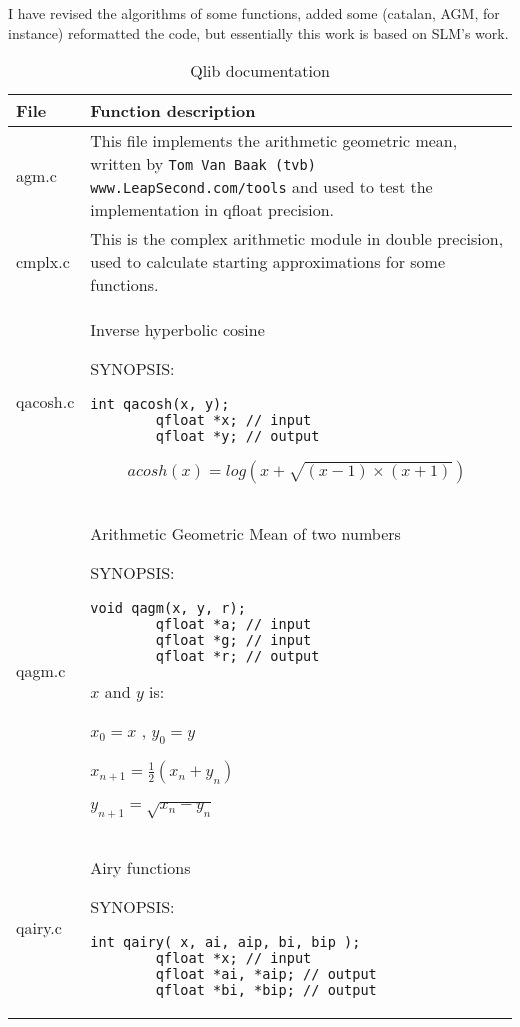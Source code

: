 \documentclass[10pt,a4paper,x11names]{memoir} %
\newcommand{\TOC}[1] {\addcontentsline{toc}{section}{#1} #1 \par}
\begin{document}
I have revised the algorithms of some functions, added some (catalan, AGM, for instance) reformatted the code, but essentially this work is based on SLM's work.

\begin{longtable}{|p{1.5cm}|p{11.5cm}|}
	\caption{Qlib documentation}\\\hline
	\textbf{File}&\textbf{Function description}\\\hline\hline
	\endhead
	
	agm.c&This file implements the arithmetic geometric mean, written by 
	\verb,Tom Van Baak (tvb) www.LeapSecond.com/tools, and used to test the implementation in qfloat precision.\\\hline
	cmplx.c& This is the complex arithmetic module in double precision, used to calculate starting approximations for some functions.\\\hline
	qacosh.c& \addcontentsline{toc}{section}{Inverse hyperbolic cosine} Inverse hyperbolic cosine
	
	{\footnotesize SYNOPSIS:}\vspace{-0.25cm}\index{qacosh}
	\begin{lstlisting}[numbers=none]
		int qacosh(x, y);
		qfloat *x; // input
		qfloat *y; // output
	\end{lstlisting}\vspace{-0.2cm}
	\par
	$$acosh(x) = log \left(x + \sqrt{(x-1)\times (x+1)}\right)$$
	\\\hline
	qagm.c & \TOC{Arithmetic Geometric Mean of two numbers}
	
	{\footnotesize SYNOPSIS:}\vspace{-0.2cm}\index{qagm}
	\begin{lstlisting}[numbers=none]
		void qagm(x, y, r);
		qfloat *a; // input
		qfloat *g; // input
		qfloat *r; // output
	\end{lstlisting}\vspace{-0.2cm}
	
	 $x$ and $y$ is:\par
	$x_0 = x$ , 
	$y_0 = y$ \par
	$x_{n+1} = \frac{1}{2}  (x_n + y_n)$\par
	$y_{n+1} = \sqrt{x_n - y_n}$
	\\\hline
	qairy.c & \TOC{Airy functions}
	
	{\footnotesize SYNOPSIS:}\vspace{-0.2cm}\index{qairy}
	\begin{lstlisting}[numbers=none]
		int qairy( x, ai, aip, bi, bip );
		qfloat *x; // input
		qfloat *ai, *aip; // output
		qfloat *bi, *bip; // output
	\end{lstlisting}\vspace{-0.2cm}
	

\end{longtable}
\end{document}
